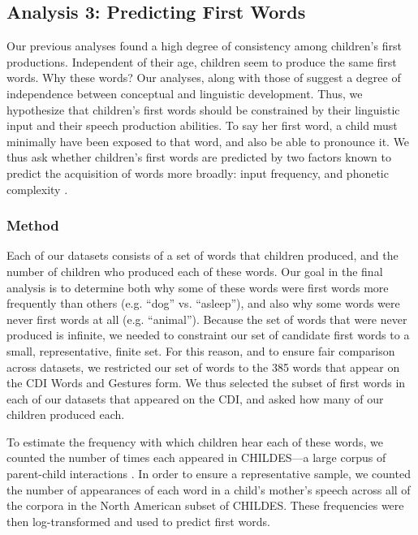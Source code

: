 \documentclass[10pt,letterpaper]{article}
\begin{document}
\subsection{Analysis 3: Predicting First Words}

Our previous analyses found a high degree of consistency among children's first productions. Independent of their age, children seem to produce the same first words. Why these words? Our analyses, along with those of  suggest a degree of independence between conceptual and linguistic development. Thus, we hypothesize that children's first words should be constrained by their linguistic input and their speech production abilities. To say her first word, a child must minimally have been exposed to that word, and also be able to pronounce it. We thus ask whether children's first words are predicted by two factors known to predict the acquisition of words more broadly: input frequency, and phonetic complexity \cite{morgan1996,goodman2008}.

\subsubsection{Method}

Each of our datasets consists of a set of words that children produced, and the number of children who produced each of these words. Our goal in the final analysis is to determine both why some of these words were first words more frequently than others (e.g. ``dog'' vs. ``asleep''), and also why some words were never first words at all (e.g. ``animal''). Because the set of words that were never produced is infinite, we needed to constraint our set of candidate first words to a small, representative, finite set. For this reason, and to ensure fair comparison across datasets, we restricted our set of words to the 385 words that appear on the CDI Words and Gestures form. We thus selected the subset of first words in each of our datasets that appeared on the CDI, and asked how many of our children produced each.

To estimate the frequency with which children hear each of these words, we counted the number of times each appeared in CHILDES---a large corpus of parent-child interactions \cite{macwhinney2000}. In order to ensure a representative sample, we counted the number of appearances of each word in a child's mother's speech across all of the corpora in the North American subset of CHILDES. These frequencies were then log-transformed and used to predict first words.
\end{document}

